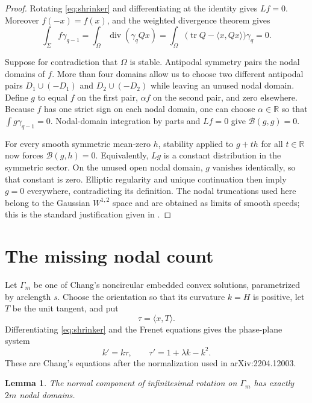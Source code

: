 \documentclass[11pt]{article}
\newtheorem{lemma}[theorem]{Lemma}
\newcommand{\R}{\mathbb R}
\newcommand{\gauss}{\gamma}
\begin{document}
\begin{proof}
Rotating \eqref{eq:shrinker} and differentiating at the identity gives
$Lf=0$.  Moreover $f(-x)=f(x)$, and the weighted divergence theorem gives
\[
 \int_\Sigma f\gauss_{q-1}
 =\int_\Omega \operatorname{div}(\gauss_q Qx)
 =\int_\Omega\bigl(\operatorname{tr}Q-\langle x,Qx\rangle\bigr)\gauss_q=0.
\]

Suppose for contradiction that $\Omega$ is stable.  Antipodal symmetry pairs
the nodal domains of $f$.  More than four domains allow us to choose two
different antipodal pairs $D_1\cup(-D_1)$ and $D_2\cup(-D_2)$ while leaving
an unused nodal domain.  Define $g$ to equal $f$ on the first pair,
$\alpha f$ on the second pair, and zero elsewhere.  Because $f$ has one
strict sign on each nodal domain, one can choose $\alpha\in\R$ so that
$\int g\gauss_{q-1}=0$.  Nodal-domain integration by parts and $Lf=0$ give
$\mathcal B(g,g)=0$.

For every smooth symmetric mean-zero $h$, stability applied to $g+th$ for
all $t\in\R$ now forces $\mathcal B(g,h)=0$.  Equivalently, $Lg$ is a
constant distribution in the symmetric sector.  On the unused open nodal
domain, $g$ vanishes identically, so that constant is zero.  Elliptic
regularity and unique continuation then imply $g=0$ everywhere, contradicting
its definition.  The nodal truncations used here belong to the Gaussian
$W^{1,2}$ space and are obtained as limits of smooth speeds; this is the
standard justification given in \cite[Corollary 11.9]{Heilman17}.
\end{proof}

\section{The missing nodal count}

Let $\Gamma_m$ be one of Chang's noncircular embedded convex solutions,
parametrized by arclength $s$.  Choose the orientation so that its curvature
$k=H$ is positive, let $T$ be the unit tangent, and put
\[
 \tau=\langle x,T\rangle.
\]
Differentiating \eqref{eq:shrinker} and the Frenet equations gives the
phase-plane system
\begin{equation}\label{eq:phase}
 k'=k\tau,
 \qquad
 \tau'=1+\lambda k-k^2.
\end{equation}
These are Chang's equations after the normalization used in
arXiv:2204.12003.

\begin{lemma}\label{lem:count}
The normal component of infinitesimal rotation on $\Gamma_m$ has exactly
$2m$ nodal domains.
\end{lemma}
\end{document}
